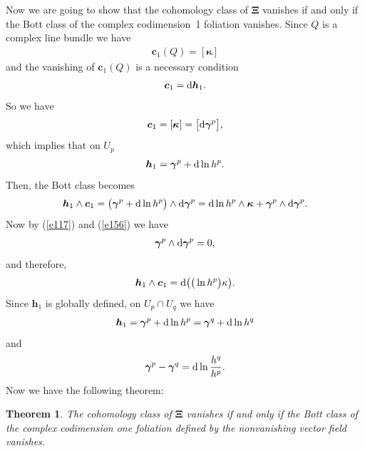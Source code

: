 \documentclass[pdftex]{sigma}
\numberwithin{equation}{section}
\newtheorem{Theorem}{Theorem}[section]
\begin{document}
Now we are going to show that the cohomology class of $\boldsymbol{\Xi }$ vanishes if and only if the Bott class of the complex codimension~1 foliation vanishes. Since $Q$ is a complex line bundle we have
\begin{gather*}
\boldsymbol{c}_{1}(Q) = [ \boldsymbol{\kappa } ]
\end{gather*}
and the vanishing of $\boldsymbol{c}_{1}(Q) $ is a necessary condition
\begin{gather*}
\boldsymbol{c}_{1}={\rm d}\boldsymbol{h}_{1}.
\end{gather*}
So we have
\begin{gather*}
\boldsymbol{c}_{1}= [ \boldsymbol{\kappa } ] =\big[ {\rm d}\boldsymbol{\gamma }^{p}\big],
\end{gather*}
which implies that on $U_{p}$
\begin{gather*}
\boldsymbol{h}_{1}=\boldsymbol{\gamma }^{p}+{\rm d}\ln h^{p}.
\end{gather*}
Then, the Bott class \cite{Bott} becomes
\begin{gather*}
\boldsymbol{h}_{1}\wedge \boldsymbol{c}_{1}=\big( \boldsymbol{\gamma }^{p}+{\rm d}\ln h^{p}\big) \wedge {\rm d}\boldsymbol{\gamma }^{p}={\rm d}\ln h^{p}\wedge \boldsymbol{\kappa }+\boldsymbol{\gamma }^{p}\wedge {\rm d}\boldsymbol{\gamma }^{p}.
\end{gather*}
Now by (\ref{e117}) and (\ref{e156}) we have
\begin{gather*}
\boldsymbol{\gamma }^{p}\wedge {\rm d}\boldsymbol{\gamma }^{p}=0,
\end{gather*}
and therefore,
\begin{gather*}
\boldsymbol{h}_{1}\wedge \boldsymbol{c}_{1}={\rm d}\big( \big( \ln h^{p}\big) \kappa\big).
\end{gather*}
Since $\boldsymbol{h}_{1}$ is globally def\/ined, on $U_{p}\cap U_{q}$ we have
\begin{gather*}
\boldsymbol{h}_{1}=\boldsymbol{\gamma }^{p}+{\rm d}\ln h^{p}=\boldsymbol{\gamma }^{q}+{\rm d}\ln h^{q}
\end{gather*}
and
\begin{gather}
\boldsymbol{\gamma }^{p}-\boldsymbol{\gamma }^{q}={\rm d}\ln \frac{h^{q}}{h^{p}}.
\label{e166}
\end{gather}
Now we have the following theorem:

\begin{Theorem}\label{theorem4}
The cohomology class of $\boldsymbol{\Xi }$ vanishes if and only if the Bott class of the complex codimension one foliation defined by the nonvanishing vector field vanishes.
\end{Theorem}
\end{document}
